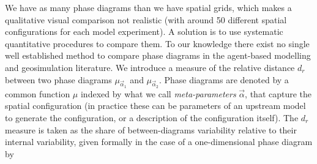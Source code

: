 \documentclass[3p,times,procedia]{elsarticle}
\begin{document}
We have as many phase diagrams than we have spatial grids, which makes a qualitative visual comparison not realistic (with around 50 different spatial configurations for each model experiment). A solution is to use systematic quantitative procedures to compare them. To our knowledge there exist no single well established method to compare phase diagrams in the agent-based modelling and geosimulation literature. We introduce a measure of the relative distance $d_r$ between two phase diagrams $\mu_{\vec{\alpha}_1}$ and $\mu_{\vec{\alpha}_2}$. Phase diagrams are denoted by a common function $\mu$ indexed by what we call \emph{meta-parameters} $\vec{\alpha}$, that capture the spatial configuration (in practice these can be parameters of an upstream model to generate the configuration, or a description of the configuration itself). The $d_r$ measure is taken as the share of between-diagrams variability relative to their internal variability, given formally in the case of a one-dimensional phase diagram by


\end{document}
